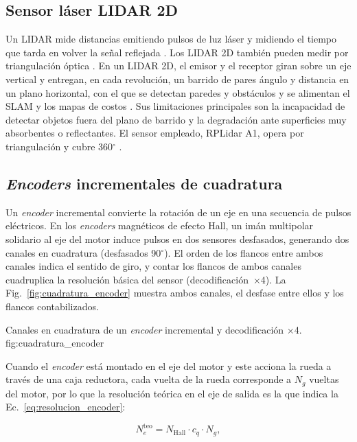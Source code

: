 \subsection{Sensor láser LIDAR 2D}
\label{sec:lidar_marco}

Un \gls{LIDAR} mide distancias emitiendo pulsos de luz láser y midiendo el tiempo que tarda en volver la señal reflejada \citep[Sec.~6.8]{corke2023}. Los \gls{LIDAR} 2D también pueden medir por triangulación óptica \citep{ran2025review2dlidar}. En un \gls{LIDAR} 2D, el emisor y el receptor giran sobre un eje vertical y entregan, en cada revolución, un barrido de pares ángulo y distancia en un plano horizontal, con el que se detectan paredes y obstáculos y se alimentan el SLAM y los mapas de costos \citep{corke2023}. Sus limitaciones principales son la incapacidad de detectar objetos fuera del plano de barrido y la degradación ante superficies muy absorbentes o reflectantes. El sensor empleado, RPLidar A1, opera por triangulación y cubre 360$^\circ$ \citep{SlamtecA1Datasheet}.

\subsection{\texorpdfstring{\textit{Encoders}}{Encoders} incrementales de cuadratura}
\label{sec:encoders_marco}

Un \textit{encoder} incremental convierte la rotación de un eje en una secuencia de
pulsos eléctricos. En los \textit{encoders} magnéticos de efecto Hall, un imán
multipolar solidario al eje del motor induce pulsos en dos sensores
desfasados, generando dos canales en cuadratura (desfasados 90$^\circ$). El
orden de los flancos entre ambos canales indica el sentido de giro, y contar
los flancos de ambos canales cuadruplica la resolución básica del sensor
(decodificación~$\times$4). La Fig.~\ref{fig:cuadratura_encoder} muestra ambos
canales, el desfase entre ellos y los flancos contabilizados.

{Canales en cuadratura de un \textit{encoder} incremental y decodificación $\times$4.}
{fig:cuadratura_encoder}

Cuando el \textit{encoder} está montado en el eje del
motor y este acciona la rueda a través de una caja reductora, cada vuelta de
la rueda corresponde a $N_g$ vueltas del motor, por lo que la resolución
teórica en el eje de salida es la que indica la Ec.~\eqref{eq:resolucion_encoder}:

\begin{equation}
N_e^{\mathrm{teo}} = N_{\mathrm{Hall}} \cdot c_q \cdot N_g,
\label{eq:resolucion_encoder}
\end{equation}


